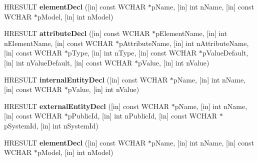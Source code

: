 \begin{DoxyCompactItemize}
H\+R\+E\+S\+U\+LT {\bfseries element\+Decl} (\mbox{[}in\mbox{]} const W\+C\+H\+AR $\ast$p\+Name, \mbox{[}in\mbox{]} int n\+Name, \mbox{[}in\mbox{]} const W\+C\+H\+AR $\ast$p\+Model, \mbox{[}in\mbox{]} int n\+Model)
\item 
\mbox{\label{interface_m_s_x_m_l2_1_1_i_s_a_x_decl_handler_a578a102b31fca7f4aed40e2b3cbb293b}} 
H\+R\+E\+S\+U\+LT {\bfseries attribute\+Decl} (\mbox{[}in\mbox{]} const W\+C\+H\+AR $\ast$p\+Element\+Name, \mbox{[}in\mbox{]} int n\+Element\+Name, \mbox{[}in\mbox{]} const W\+C\+H\+AR $\ast$p\+Attribute\+Name, \mbox{[}in\mbox{]} int n\+Attribute\+Name, \mbox{[}in\mbox{]} const W\+C\+H\+AR $\ast$p\+Type, \mbox{[}in\mbox{]} int n\+Type, \mbox{[}in\mbox{]} const W\+C\+H\+AR $\ast$p\+Value\+Default, \mbox{[}in\mbox{]} int n\+Value\+Default, \mbox{[}in\mbox{]} const W\+C\+H\+AR $\ast$p\+Value, \mbox{[}in\mbox{]} int n\+Value)
\item 
\mbox{\label{interface_m_s_x_m_l2_1_1_i_s_a_x_decl_handler_a9ced085aa221826fda98e637e74dbab9}} 
H\+R\+E\+S\+U\+LT {\bfseries internal\+Entity\+Decl} (\mbox{[}in\mbox{]} const W\+C\+H\+AR $\ast$p\+Name, \mbox{[}in\mbox{]} int n\+Name, \mbox{[}in\mbox{]} const W\+C\+H\+AR $\ast$p\+Value, \mbox{[}in\mbox{]} int n\+Value)
\item 
\mbox{\label{interface_m_s_x_m_l2_1_1_i_s_a_x_decl_handler_a509bf7c25a580f3df2dd02fd59583dff}} 
H\+R\+E\+S\+U\+LT {\bfseries external\+Entity\+Decl} (\mbox{[}in\mbox{]} const W\+C\+H\+AR $\ast$p\+Name, \mbox{[}in\mbox{]} int n\+Name, \mbox{[}in\mbox{]} const W\+C\+H\+AR $\ast$p\+Public\+Id, \mbox{[}in\mbox{]} int n\+Public\+Id, \mbox{[}in\mbox{]} const W\+C\+H\+AR $\ast$p\+System\+Id, \mbox{[}in\mbox{]} int n\+System\+Id)
\item 
\mbox{\label{interface_m_s_x_m_l2_1_1_i_s_a_x_decl_handler_aa0b02d77df8f1251429a0a6ff0853368}} 
H\+R\+E\+S\+U\+LT {\bfseries element\+Decl} (\mbox{[}in\mbox{]} const W\+C\+H\+AR $\ast$p\+Name, \mbox{[}in\mbox{]} int n\+Name, \mbox{[}in\mbox{]} const W\+C\+H\+AR $\ast$p\+Model, \mbox{[}in\mbox{]} int n\+Model)
\item 
\mbox{\label{interface_m_s_x_m_l2_1_1_i_s_a_x_decl_handler_a578a102b31fca7f4aed40e2b3cbb293b}} 

\end{DoxyCompactItemize}

